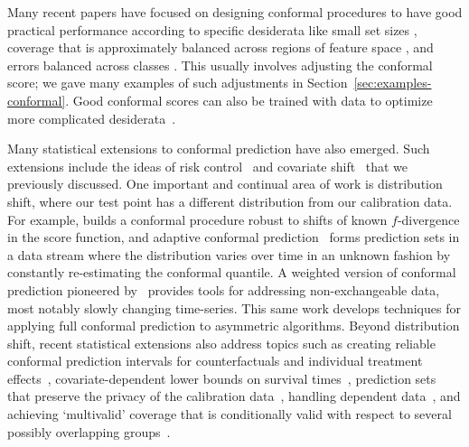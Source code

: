 \documentclass[10pt]{article}
\begin{document}
Many recent papers have focused on designing conformal procedures to have good practical performance according to specific desiderata like small set sizes \citep{Sadinle2016LeastAS}, coverage that is approximately balanced across regions of feature space \citep{foygel2021limits, izbicki2019flexible, romano2020classification, cauchois2020knowing, guan2020conformal, angelopoulos2020sets}, and errors balanced across classes \citep{lei2014classification, Sadinle2016LeastAS, hechtlinger2018cautious, guan2019prediction}. 
This usually involves adjusting the conformal score; we gave many examples of such adjustments in Section~\ref{sec:examples-conformal}.
Good conformal scores can also be trained with data to optimize more complicated desiderata~\cite{stutz2021learning}.
 
Many statistical extensions to conformal prediction have also emerged.
Such extensions include the ideas of risk control~\cite{angelopoulos2020sets,angelopoulos2021learn} and covariate shift~\cite{tibshirani2019conformal} that we previously discussed.
One important and continual area of work is distribution shift, where our test point has a different distribution from our calibration data.
For example, \cite{cauchois2020robust} builds a conformal procedure robust to shifts of known $f$-divergence in the score function, and adaptive conformal prediction~\cite{gibbs2021adaptive} forms prediction sets in a data stream where the distribution varies over time in an unknown fashion by constantly re-estimating the conformal quantile.
A weighted version of conformal prediction pioneered by~\cite{barber2022conformal} provides tools for addressing non-exchangeable data, most notably slowly changing time-series.
This same work develops techniques for applying full conformal prediction to asymmetric algorithms.
Beyond distribution shift, recent statistical extensions also address topics such as creating reliable conformal prediction intervals for counterfactuals and individual treatment effects~\citep{lei2020conformal,yin2021conformal,chernozhukov2021exact}, covariate-dependent lower bounds on survival times~\citep{candes2021conformalized}, prediction sets that preserve the privacy of the calibration data~\citep{angelopoulos2021private}, handling dependent data~\citep{chernozhukov2018exact, dunn2018distribution,oliveira2022split}, and achieving `multivalid' coverage that is conditionally valid with respect to several possibly overlapping groups~\citep{bastani2022practical, jung2022batch}.
\end{document}
